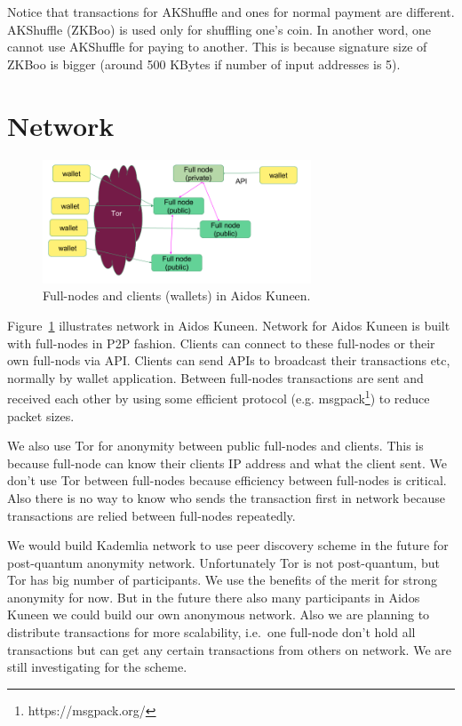 \documentclass[a4paper,10pt,twocolumn]{article}
\begin{document}
Notice that transactions for AKShuffle and ones for normal payment are different. AKShuffle (ZKBoo) is used only for shuffling one's coin.
In another word, one cannot use AKShuffle for paying to another.
This is because signature size of ZKBoo is bigger (around 500 KBytes if number of input addresses is 5).


\section{Network}
\label{sec:network}

\begin{figure}[ht]
	\begin{center}
	\includegraphics[width=80mm]{network.png}
	  \caption{Full-nodes and clients (wallets) in Aidos Kuneen.}
    \label{fig:network}
	\end{center}
 \end{figure}

 Figure~\ref{fig:network} illustrates network in Aidos Kuneen.
Network for Aidos Kuneen is built with full-nodes in P2P fashion. Clients can connect to these full-nodes
or their own full-nods via API. Clients can send APIs to broadcast their transactions etc, normally by wallet application.
 Between full-nodes transactions are sent and received each other by using some efficient protocol (e.g. msgpack\footnote{https://msgpack.org/})
 to reduce packet sizes. 

We also use Tor for anonymity between public full-nodes and clients. This is because 
full-node can know their clients IP address and what the client sent.  We don't use Tor between full-nodes because efficiency between
full-nodes is critical. Also  there is no way to know who sends the transaction first in network because transactions are relied between 
full-nodes repeatedly.

We would build Kademlia network to use peer discovery scheme in the future for post-quantum anonymity network. 
Unfortunately Tor is not post-quantum, but Tor has big number of participants. We use the benefits of the merit
for strong anonymity for now. But in the future there also many participants in Aidos Kuneen we could build our own anonymous network.
Also we are planning to distribute transactions for more scalability, i.e.\ one full-node don't hold all transactions but can get any certain
transactions from others on network.
We are still investigating for the scheme.
\end{document}
